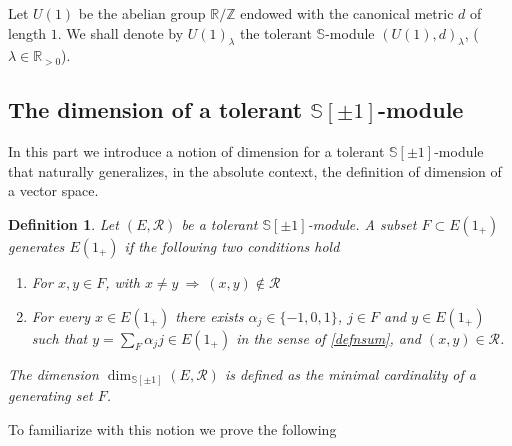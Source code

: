 \documentclass[cupthm]{CUP-JNL-JMJ}
\numberwithin{equation}{section}
\theoremstyle{cupplain}
\theoremstyle{cupdefinition}
\newtheorem{definition}{Definition}[section]
\theoremstyle{cupremark}
\theoremstyle{cupproof}
\def\R{{\mathbb R}}
\def\S{{\mathbb S}}
\def\Z{{\mathbb Z}}
\def\cR{{\mathcal R}}
\def\sss{{\S}}
\def\spm{{\sss[\pm 1]}}
\begin{document}
\begin{appendix}
 Let  $U(1)$ be the abelian group $\R/\Z$ endowed with the canonical metric $d$ of length $1$. We shall denote by $U(1)_\lambda$ the tolerant $\sss$-module $(U(1),d)_\lambda$,  ($\lambda\in\R_{>0}$).

 
 \subsection{The dimension of a tolerant $\spm$-module}
 
 In this part we  introduce a notion of dimension for a tolerant $\spm$-module that naturally generalizes, in the absolute context, the  definition of dimension of a vector space. 
 
\begin{definition}\label{generator}
 Let $(E,\cR)$ be a tolerant $\spm$-module. 
	A subset $F\subset E(1_+)$ generates $E(1_+)$ if the following two conditions hold
	\begin{enumerate}
	\item For $x,y\in F$, with $x\neq y ~\Longrightarrow~ (x,y)\notin \cR$	
	\item For every   $x\in E(1_+)$ there exists  $\alpha_j\in \{-1,0,1\}$,  $j\in F$ and $y\in E(1_+)$ such that $y=\sum_F \alpha_j j\in E(1_+)$ in the sense of \eqref{defnsum},  and $(x,y)\in \cR$.
	\end{enumerate}
  The dimension $\dim_{\spm}(E,\cR)$ is defined as the minimal cardinality of a generating set $F$.
	\end{definition}
 
 
 To familiarize with this notion we  prove the following 
 

\end{appendix}
\end{document}

